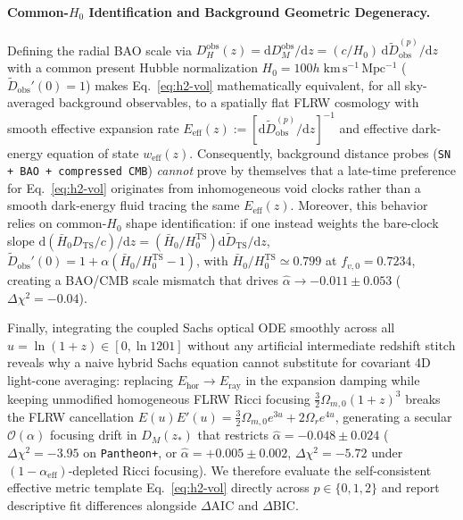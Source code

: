 \documentclass[11pt,a4paper]{article}
\begin{document}
\paragraph{Common-$H_0$ Identification and Background Geometric Degeneracy.} Defining the radial BAO scale via $D_H^{\mathrm{obs}}(z) = \mathrm{d}D_M^{\mathrm{obs}}/\mathrm{d}z = (c/H_0)\,\mathrm{d}\widetilde{D}_{\mathrm{obs}}^{(p)}/\mathrm{d}z$ with a common present Hubble normalization $H_0 = 100h\;\mathrm{km\,s^{-1}\,Mpc^{-1}}$ ($\widetilde{D}_{\mathrm{obs}}'(0) = 1$) makes Eq.~\eqref{eq:h2-vol} mathematically equivalent, for all sky-averaged background observables, to a spatially flat FLRW cosmology with smooth effective expansion rate $E_{\mathrm{eff}}(z) := [\mathrm{d}\widetilde{D}_{\mathrm{obs}}^{(p)}/\mathrm{d}z]^{-1}$ and effective dark-energy equation of state $w_{\mathrm{eff}}(z)$. Consequently, background distance probes (\texttt{SN + BAO + compressed CMB}) \textit{cannot} prove by themselves that a late-time preference for Eq.~\eqref{eq:h2-vol} originates from inhomogeneous void clocks rather than a smooth dark-energy fluid tracing the same $E_{\mathrm{eff}}(z)$. Moreover, this behavior relies on common-$H_0$ shape identification: if one instead weights the bare-clock slope $\mathrm{d}(\bar{H}_0 D_{\mathrm{TS}}/c)/\mathrm{d}z = (\bar{H}_0/H_0^{\mathrm{TS}})\mathrm{d}\widetilde{D}_{\mathrm{TS}}/\mathrm{d}z$, $\widetilde D_{\mathrm{obs}}'(0)=1+\alpha(\bar H_0/H_0^{\mathrm{TS}}-1)$, with $\bar H_0/H_0^{\mathrm{TS}}\simeq0.799$ at $f_{v,0}=0.7234$, creating a BAO/CMB scale mismatch that drives $\hat{\alpha} \to -0.011 \pm 0.053$ ($\Delta\chi^2 = -0.04$).

Finally, integrating the coupled Sachs optical ODE smoothly across all $u = \ln(1+z) \in [0, \ln 1201]$ without any artificial intermediate redshift stitch reveals why a naive hybrid Sachs equation cannot substitute for covariant 4D light-cone averaging: replacing $E_{\mathrm{hor}} \to E_{\mathrm{ray}}$ in the expansion damping while keeping unmodified homogeneous FLRW Ricci focusing $\frac{3}{2}\Omega_{m,0}(1+z)^3$ breaks the FLRW cancellation $E(u)E'(u) = \frac{3}{2}\Omega_{m,0}e^{3u} + 2\Omega_r e^{4u}$, generating a secular $\mathcal{O}(\alpha)$ focusing drift in $D_M(z_*)$ that restricts $\hat{\alpha} = -0.048 \pm 0.024$ ($\Delta\chi^2 = -3.95$ on \texttt{Pantheon+}, or $\hat{\alpha} = +0.005 \pm 0.002$, $\Delta\chi^2 = -5.72$ under $(1-\alpha_{\mathrm{eff}})$-depleted Ricci focusing). We therefore evaluate the self-consistent effective metric template Eq.~\eqref{eq:h2-vol} directly across $p \in \{0, 1, 2\}$ and report descriptive fit differences alongside $\Delta\mathrm{AIC}$ and $\Delta\mathrm{BIC}$.
\end{document}
